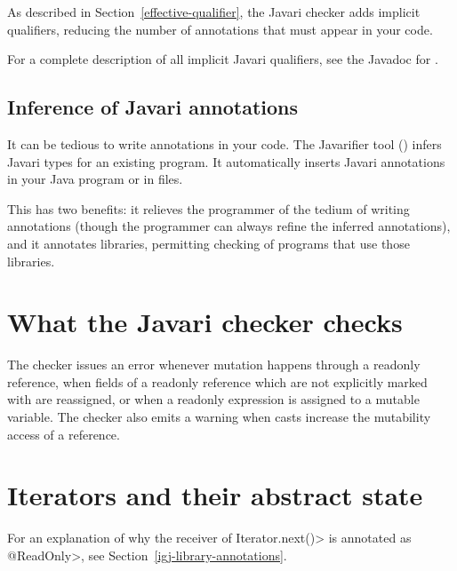 As described in Section~\ref{effective-qualifier}, the Javari checker
adds implicit qualifiers, reducing the number of annotations that must
appear in your code.

For a complete description of all implicit Javari qualifiers, see the
Javadoc for .


\subsection{Inference of Javari annotations\label{javari-inference}}

It can be tedious to write annotations in your code.  The Javarifier tool
() infers 
Javari types for an existing program.  It 
automatically inserts Javari annotations in your Java program or
in  files.

This has two benefits:  it relieves the programmer of the tedium of writing
annotations (though the programmer can always refine the inferred
annotations), and it annotates libraries, permitting checking of programs
that use those libraries.



\section{What the Javari checker checks\label{javari-checks}}

The checker issues an error whenever mutation happens through a readonly
reference, when fields of a readonly reference which are not explicitly
marked with  are reassigned, or
when a readonly expression is assigned to a mutable variable.  The checker
also emits a warning when casts increase the mutability access of a
reference.



\section{Iterators and their abstract state\label{javari-library-annotations}}

For an explanation of why the receiver of \<Iterator.next()> is annotated
as \<@ReadOnly>, see Section~\ref{igj-library-annotations}.


